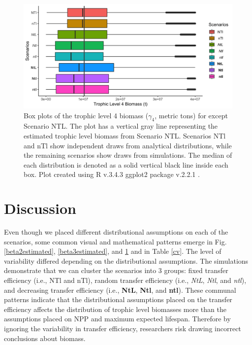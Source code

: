 \documentclass[oneside,12pt,final]{sty/ucthesis-CA2012}
\let\cite\citep                             %
\begin{document}
\begin{mainmatter}
\begin{figure}[H]
     \centering
       \includegraphics[width=\textwidth]{fig/biomass4_box.png}
    \caption{Box plots of the trophic level 4 biomass ($\gamma_4$, metric tons) for except Scenario NTL. The plot has a vertical gray line representing the estimated trophic level biomass from Scenario NTL. Scenarios NTl and nTl show independent draws from analytical distributions, while the remaining scenarios show draws from simulations. The median of each distribution is denoted as a solid vertical black line inside each box. Plot created using R v.3.4.3 \cite{Rcite} ggplot2 package v.2.2.1 \cite{ggplot}. }
    \label{beta4estimated}
\end{figure}


\section{Discussion}
Even though we placed different distributional assumptions on each of the scenarios, some common visual and mathematical patterns emerge in Fig. \ref{beta2estimated}, \ref{beta3estimated}, and \ref{beta4estimated} and in Table \ref{cv}. The level of variability differed depending on the distributional assumptions. The simulations demonstrate that we can cluster the scenarios into 3 groups: fixed transfer efficiency (i.e., NTl and nTl), random transfer efficiency (i.e., \textit{NtL}, \textit{Ntl}, and \textit{ntl}), and decreasing transfer efficiency (i.e., \textbf{NtL}, \textbf{Ntl}, and \textbf{ntl}). These communal patterns indicate that the distributional assumptions placed on the transfer efficiency affects the distribution of trophic level biomasses more than the assumptions placed on NPP and maximum expected lifespan. Therefore by ignoring the variability in transfer efficiency, researchers risk drawing incorrect conclusions about biomass. 


\end{mainmatter}
\end{document}
